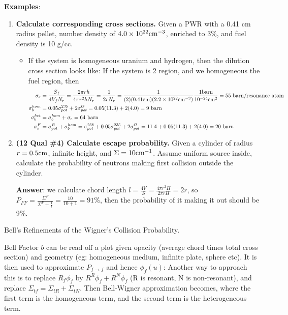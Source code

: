 \documentclass{school-22.211-notes}
\begin{document}
\textbf{Examples}: 
\begin{enumerate}
\item \textbf{Calculate corresponding cross sections.} Given a PWR with a 0.41 cm radius pellet,  number density of $4.0 \times 10^{22} \mathrm{cm}^{-3}$, enriched to 3\%, and fuel density is 10 g/cc. 
\begin{itemize}
\item If the system is homogeneous uranium and hydrogen, then the dilution cross section looks like:
If the system is 2 region, and we homogeneous the fuel region, then
\begin{align}
\sigma_e &= \frac{S_f}{4 V_f N_r} = \frac{2 \pi r h}{4 \pi r^2 h N_r} = \frac{1}{2 r N_r} = \frac{1}{(2)(0.41 \mathrm{cm})(2.2 \times 10^{22} \mathrm{cm}^{-3})} \frac{1 \mathrm{barn}}{10^{-24} \mathrm{cm}^2} = 55 \mbox{ } \mathrm{barn}/\mbox{resonance atom} \\
\sigma_b^{hom} &=  0.05 \sigma_{pot}^{235} + 2 \sigma_{pot}^O = 0.05 (11.3) + 2 (4.0) = 9 \mbox{ } \mathrm{barn} \\
\sigma_b^{het} &= \sigma_b^{hom} + \sigma_e = 64 \mbox{ } \mathrm{barn} \\ 
\sigma_s^F &= \sigma_{pot}^R + \sigma_b^{hom} = \sigma_{pot}^{238} + 0.05 \sigma_{pot}^{235} + 2 \sigma_{pot}^O = 11.4 + 0.05 (11.3) + 2 (4.0) = 20 \mbox{ } \mathrm{barn} 
\end{align} 
\end{itemize}


\item \textbf{(12 Qual \#4) Calculate escape probability.} Given a cylinder of radius $r=0.5\mathrm{cm}$, infinite height, and $\Sigma = 10 \mathrm{cm}^{-1}$. Assume uniform source inside, calculate the probability of neutrons making first collision outside the cylinder. 

\textbf{Answer}: we calculate chord length $l = \frac{4V}{S} = \frac{4 \pi r^2 H}{2 \pi r H} = 2r$, so $\displaystyle P_{FF} = \frac{\Sigma^F}{\Sigma^F + \frac{1}{l}} = \frac{10}{10+1} = 91$\%, then the probability of it making it out should be 9\%. 
\end{enumerate}


\clearpage
{}
Bell's Refinements of the Wigner's Collision Probability.

Bell Factor $b$ can be read off a plot given opacity (average chord times total cross section) and geometry (eg: homogeneous medium, infinite plate, sphere etc). It is then used to approximate $P_{f\to f}$ and hence $\phi_f(u)$:
Another way to approach this is to replace $R_f \phi_f$ by $R^R \phi_f + R^N \phi_f$ (R is resonant, N is non-resonant), and replace $\Sigma_{tf} = \Sigma_{tR} + \Sigma_{tN}$. Then 
Bell-Wigner approximation becomes, where the first term is the homogeneous term, and the second term is the heterogeneous term. 
\end{document}
